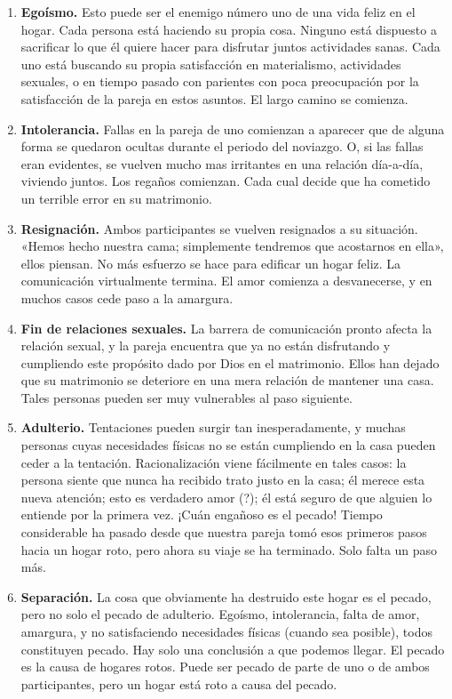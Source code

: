 \documentclass[12pt, twoside, openright]{book}
\begin{document}
\begin{enumerate}
\item \textbf{Egoísmo.} Esto puede ser el enemigo número uno de una vida feliz en el hogar. Cada persona está haciendo su propia cosa. Ninguno está dispuesto a sacrificar lo que él quiere hacer para disfrutar juntos actividades sanas. Cada uno está buscando su propia satisfacción en materialismo, actividades sexuales, o en tiempo pasado con parientes con poca preocupación por la satisfacción de la pareja en estos asuntos. El largo camino se comienza. 
\item \textbf{Intolerancia.} Fallas en la pareja de uno comienzan a aparecer que de alguna forma se quedaron ocultas durante el periodo del noviazgo. O, si las fallas eran evidentes, se vuelven mucho mas irritantes en una relación día-a-día, viviendo juntos. Los regaños comienzan. Cada cual decide que ha cometido un terrible error en su matrimonio.
\item \textbf{Resignación.} Ambos participantes se vuelven resignados a su situación. «Hemos hecho nuestra cama; simplemente tendremos que acostarnos en ella», ellos piensan. No más esfuerzo se hace para edificar un hogar feliz. La comunicación virtualmente termina. El amor comienza a desvanecerse, y en muchos casos cede paso a la amargura. 
\item \textbf{Fin de relaciones sexuales.} La barrera de comunicación pronto afecta la relación sexual, y la pareja encuentra que ya no están disfrutando y cumpliendo este propósito dado por Dios en el matrimonio. Ellos han dejado que su matrimonio se deteriore en una mera relación de mantener una casa. Tales personas pueden ser muy vulnerables al paso siguiente. 
\item \textbf{Adulterio.} Tentaciones pueden surgir tan inesperadamente, y muchas personas cuyas necesidades físicas no se están cumpliendo en la casa pueden ceder a la tentación. Racionalización viene fácilmente en tales casos: la persona siente que nunca ha recibido trato justo en la casa; él merece esta nueva atención; esto es verdadero amor (?); él está seguro de que alguien lo entiende por la primera vez. ¡Cuán engañoso es el pecado! Tiempo considerable ha pasado desde que nuestra pareja tomó esos primeros pasos hacia un hogar roto, pero ahora su viaje se ha terminado. Solo falta un paso más.
\item \textbf{Separación.} La cosa que obviamente ha destruido este hogar es el pecado, pero no solo el pecado de adulterio. Egoísmo, intolerancia, falta de amor, amargura, y no satisfaciendo necesidades físicas (cuando sea posible), todos constituyen pecado. Hay solo una conclusión a que podemos llegar. El pecado es la causa de hogares rotos. Puede ser pecado de parte de uno o de ambos participantes, pero un hogar está roto a causa del pecado.
\end{enumerate}
\end{document}
